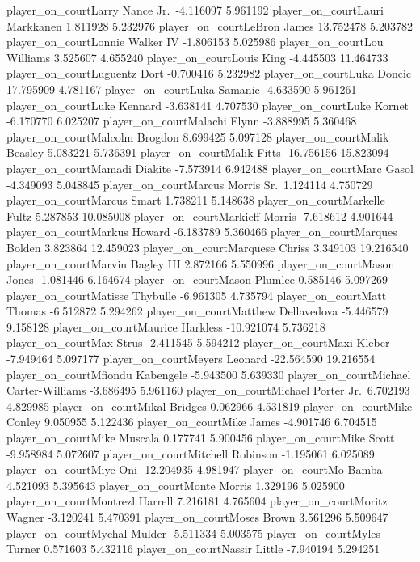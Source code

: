 \documentclass[
  landscape]{article}
\begin{document}
player\_on\_courtLarry Nance Jr.~-4.116097 5.961192
player\_on\_courtLauri Markkanen 1.811928 5.232976
player\_on\_courtLeBron James 13.752478 5.203782 player\_on\_courtLonnie
Walker IV -1.806153 5.025986 player\_on\_courtLou Williams 3.525607
4.655240 player\_on\_courtLouis King -4.445503 11.464733
player\_on\_courtLuguentz Dort -0.700416 5.232982 player\_on\_courtLuka
Doncic 17.795909 4.781167 player\_on\_courtLuka Samanic -4.633590
5.961261 player\_on\_courtLuke Kennard -3.638141 4.707530
player\_on\_courtLuke Kornet -6.170770 6.025207 player\_on\_courtMalachi
Flynn -3.888995 5.360468 player\_on\_courtMalcolm Brogdon 8.699425
5.097128 player\_on\_courtMalik Beasley 5.083221 5.736391
player\_on\_courtMalik Fitts -16.756156 15.823094
player\_on\_courtMamadi Diakite -7.573914 6.942488 player\_on\_courtMarc
Gasol -4.349093 5.048845 player\_on\_courtMarcus Morris Sr.~1.124114
4.750729 player\_on\_courtMarcus Smart 1.738211 5.148638
player\_on\_courtMarkelle Fultz 5.287853 10.085008
player\_on\_courtMarkieff Morris -7.618612 4.901644
player\_on\_courtMarkus Howard -6.183789 5.360466
player\_on\_courtMarques Bolden 3.823864 12.459023
player\_on\_courtMarquese Chriss 3.349103 19.216540
player\_on\_courtMarvin Bagley III 2.872166 5.550996
player\_on\_courtMason Jones -1.081446 6.164674 player\_on\_courtMason
Plumlee 0.585146 5.097269 player\_on\_courtMatisse Thybulle -6.961305
4.735794 player\_on\_courtMatt Thomas -6.512872 5.294262
player\_on\_courtMatthew Dellavedova -5.446579 9.158128
player\_on\_courtMaurice Harkless -10.921074 5.736218
player\_on\_courtMax Strus -2.411545 5.594212 player\_on\_courtMaxi
Kleber -7.949464 5.097177 player\_on\_courtMeyers Leonard -22.564590
19.216554 player\_on\_courtMfiondu Kabengele -5.943500 5.639330
player\_on\_courtMichael Carter-Williams -3.686495 5.961160
player\_on\_courtMichael Porter Jr.~6.702193 4.829985
player\_on\_courtMikal Bridges 0.062966 4.531819 player\_on\_courtMike
Conley 9.050955 5.122436 player\_on\_courtMike James -4.901746 6.704515
player\_on\_courtMike Muscala 0.177741 5.900456 player\_on\_courtMike
Scott -9.958984 5.072607 player\_on\_courtMitchell Robinson -1.195061
6.025089 player\_on\_courtMiye Oni -12.204935 4.981947
player\_on\_courtMo Bamba 4.521093 5.395643 player\_on\_courtMonte
Morris 1.329196 5.025900 player\_on\_courtMontrezl Harrell 7.216181
4.765604 player\_on\_courtMoritz Wagner -3.120241 5.470391
player\_on\_courtMoses Brown 3.561296 5.509647 player\_on\_courtMychal
Mulder -5.511334 5.003575 player\_on\_courtMyles Turner 0.571603
5.432116 player\_on\_courtNassir Little -7.940194 5.294251
\end{document}
